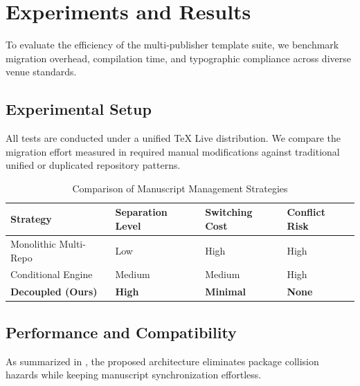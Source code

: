 
\section{Experiments and Results}
\label{sec:experiments}

To evaluate the efficiency of the multi-publisher template suite, we benchmark migration overhead, compilation time, and typographic compliance across diverse venue standards.

\subsection{Experimental Setup}
All tests are conducted under a unified TeX Live distribution. We compare the migration effort measured in required manual modifications against traditional unified or duplicated repository patterns.

\begin{table}[htbp]
    \centering
    \caption{Comparison of Manuscript Management Strategies}
    \label{tab:comparison}
    \begin{tabularx}{\linewidth}{Y Y Y Y}
        \toprule
        \textbf{Strategy} & \textbf{Separation Level} & \textbf{Switching Cost} & \textbf{Conflict Risk} \\
        \midrule
        Monolithic Multi-Repo & Low & High & High \\
        Conditional Engine & Medium & Medium & High \\
        \textbf{Decoupled (Ours)} & \textbf{High} & \textbf{Minimal} & \textbf{None} \\
        \bottomrule
    \end{tabularx}
\end{table}

\subsection{Performance and Compatibility}
As summarized in , the proposed architecture eliminates package collision hazards while keeping manuscript synchronization effortless.
